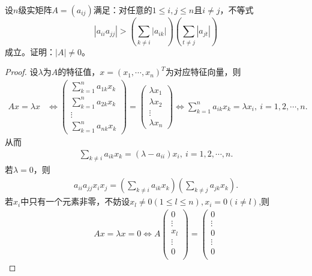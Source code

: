 \documentclass[../../main.tex]{subfiles}%
\begin{document}
\begin{example}
设$n$级实矩阵$A=(a_{ij})$满足：对任意的$1\leqslant i,j\leqslant n$且$i\neq j$，不等式$$|a_{ii}a_{jj}|>\left( \sum\limits_{k\neq i}|a_{ik}| \right)\left( \sum\limits_{t\neq j}|a_{jt}| \right)$$成立。证明：$|A|\neq 0$。
\end{example}
\begin{proof}

设$\lambda$为$A$的特征值，$x=(x_1,\cdots,x_n)^T$为对应特征向量，则
\begin{align*}
Ax=\lambda x&\Longleftrightarrow \begin{pmatrix}
\sum\limits_{k=1}^n a_{1k}x_k\\
\sum\limits_{k=1}^n a_{2k}x_k\\
\vdots\\
\sum\limits_{k=1}^n a_{nk}x_k
\end{pmatrix} = \begin{pmatrix}
\lambda x_1\\
\lambda x_2\\
\vdots\\
\lambda x_n
\end{pmatrix} \Longleftrightarrow \sum\limits_{k=1}^n a_{ik}x_k=\lambda x_i,\ i=1,2,\cdots,n.
\end{align*}
从而
\begin{align*}
\sum\limits_{k\ne i} a_{ik}x_k=(\lambda -a_{ii})x_i,\ i=1,2,\cdots,n.
\end{align*}
若$\lambda=0$，则
\begin{align}
a_{ii}a_{jj}x_ix_j=\left( \sum\limits_{k\ne i} a_{ik}x_k \right)\left( \sum\limits_{k\ne j} a_{jk}x_k \right). \label{eq::::---823hfheofgu3894f34gxzz1}
\end{align}
若$x_i$中只有一个元素非零，不妨设$x_l\neq 0(1\leq l\leq n),x_i=0(i\neq l)$,则
\begin{align*}
Ax=\lambda x=0\Longleftrightarrow A\left( \begin{array}{c}
0\\
\vdots\\
x_l\\
\vdots\\
0\\
\end{array} \right) =\left( \begin{array}{c}
0\\
\vdots\\
0\\
\vdots\\
0\\

\end{array}
\end{align*}
\end{proof}
\end{document}
